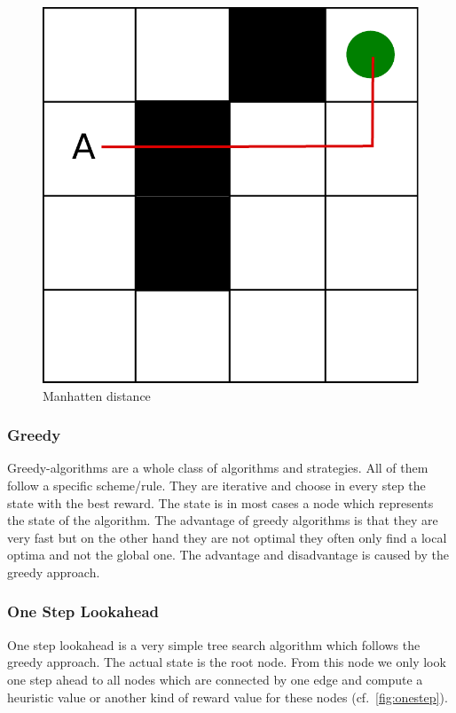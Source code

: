 \begin{figure}
\centering
\includegraphics[scale=0.3]{images/manhatten.pdf}
\caption{Manhatten distance}
\label{fig:manhatten}
\end{figure}



\subsubsection{Greedy}

Greedy-algorithms are a whole class of algorithms and strategies. All of them follow a specific scheme/rule. They are iterative and choose in every step the state with the best reward. The state is in most cases a node which represents the state of the algorithm. The advantage of greedy algorithms is that they are very fast but on the other hand they are not optimal they often only find a local optima and not the global one. The advantage and disadvantage is caused by the greedy approach.  

\subsubsection{One Step Lookahead}

One step lookahead is a very simple tree search algorithm which follows the greedy approach. The actual state is the root node. From this node we only look one step ahead to all nodes which are connected by one edge and compute a heuristic value or another kind of reward value for these nodes (cf.~\cref{fig:onestep}). 

